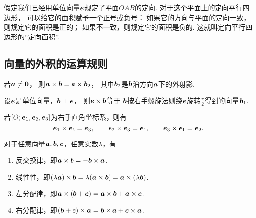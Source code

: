 假定我们已经用单位向量\(\boldsymbol{e}\)规定了平面\(OAB\)的定向.
对于这个平面上的定向平行四边形，
可以给它的面积赋予一个正号或负号：
如果它的方向与平面的定向一致，则规定它的面积是正的；
如果不一致，则规定它的面积是负的.
这就叫定向平行四边形的“定向面积”.

\subsection{向量的外积的运算规则}
\begin{theorem}
若\(\boldsymbol{a}\neq\boldsymbol{0}\)，
则\(\boldsymbol{a}\times\boldsymbol{b}=\boldsymbol{a}\times\boldsymbol{b}_2\)，
其中\(\boldsymbol{b}_2\)是\(\boldsymbol{b}\)沿方向\(\boldsymbol{a}\)下的外射影.
\end{theorem}

\begin{theorem}
设\(\boldsymbol{e}\)是单位向量，\(\boldsymbol{b}\perp\boldsymbol{e}\)，
则\(\boldsymbol{e}\times\boldsymbol{b}\)等于
\(\boldsymbol{b}\)按右手螺旋法则绕\(\boldsymbol{e}\)旋转\(\frac{\pi}{2}\)得到的向量\(\boldsymbol{b}_1\).
\end{theorem}

\begin{corollary}
若\([O;\boldsymbol{e}_1,\boldsymbol{e}_2,\boldsymbol{e}_3]\)为右手直角坐标系，则有\[
	\boldsymbol{e}_1 \times \boldsymbol{e}_2 = \boldsymbol{e}_3, \qquad
	\boldsymbol{e}_2 \times \boldsymbol{e}_3 = \boldsymbol{e}_1, \qquad
	\boldsymbol{e}_3 \times \boldsymbol{e}_1 = \boldsymbol{e}_2.
\]
\end{corollary}

\begin{theorem}
对于任意向量\(\boldsymbol{a},\boldsymbol{b},\boldsymbol{c}\)，任意实数\(\lambda\)，有
\begin{enumerate}
	\item 反交换律，即\(\boldsymbol{a}\times\boldsymbol{b}=-\boldsymbol{b}\times\boldsymbol{a}\).
	\item 线性性，即\((\lambda \boldsymbol{a})\times\boldsymbol{b}
	= \lambda(\boldsymbol{a}\times\boldsymbol{b})
	= \boldsymbol{a}\times(\lambda \boldsymbol{b})\).
	\item 左分配律，即\(\boldsymbol{a}\times(\boldsymbol{b}+\boldsymbol{c})
	= \boldsymbol{a}\times\boldsymbol{b} + \boldsymbol{a}\times\boldsymbol{c}\).
	\item 右分配律，即\((\boldsymbol{b}+\boldsymbol{c})\times\boldsymbol{a}
	= \boldsymbol{b}\times\boldsymbol{a} + \boldsymbol{c}\times\boldsymbol{a}\).
\end{enumerate}
\end{theorem}

